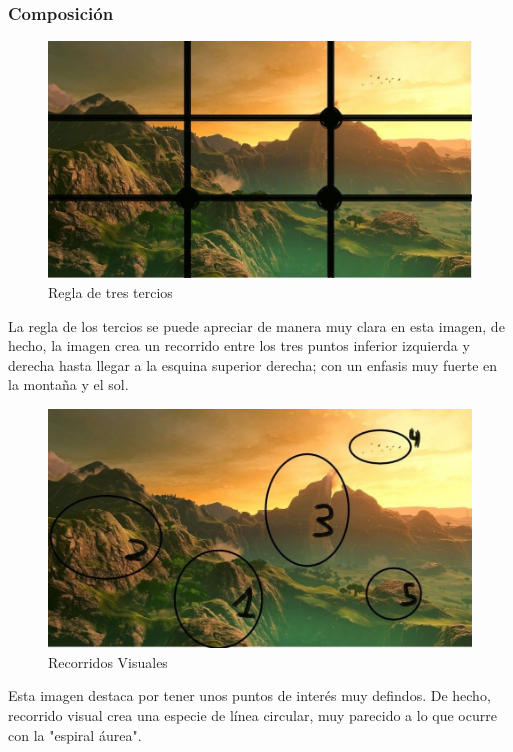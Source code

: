\documentclass[12pt]{article}
\begin{document}
        \subsubsection{Composición}
          \begin{figure}[H]
            \centering
            \includegraphics[width=\textwidth]{Jesus/Seccion16/Fondo3.JPEG}
            \caption{Regla de tres tercios}
          \end{figure}

          La regla de los tercios se puede apreciar de manera muy clara en esta imagen, de hecho, la imagen crea un recorrido entre los tres puntos inferior izquierda y derecha hasta llegar a la esquina superior derecha; con un enfasis muy fuerte en la montaña y el sol.

          \begin{figure}[H]
            \centering
            \includegraphics[width=\textwidth]{Jesus/Seccion16/Fondo5.JPEG}
            \caption{Recorridos Visuales}
          \end{figure}
          Esta imagen destaca por tener unos puntos de interés muy defindos. 
          De hecho, recorrido visual crea una especie de línea circular, muy parecido a lo que ocurre con la "espiral áurea". 
\end{document}
